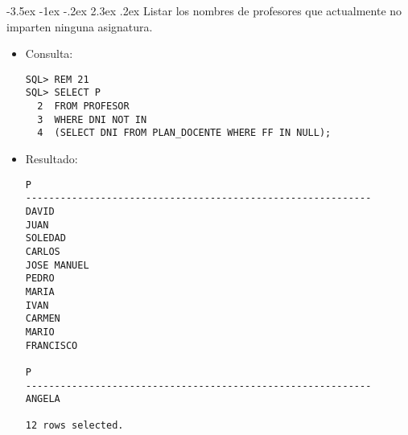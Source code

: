 \documentclass[11pt]{report}
\makeatletter
\renewcommand\chapter{\@startsection{chapter}{0}{\z@}%
    {-3.5ex \@plus -1ex \@minus -.2ex}%
    {2.3ex \@plus.2ex}%
    {\normalfont\Large\bfseries}}
\makeatother
\begin{document}
\chapter{Listar los nombres de profesores que actualmente no imparten ninguna asignatura.}
\begin{itemize}
  \item Consulta:
  \begin{verbatim}
SQL> REM 21
SQL> SELECT P
  2  FROM PROFESOR
  3  WHERE DNI NOT IN
  4  (SELECT DNI FROM PLAN_DOCENTE WHERE FF IN NULL);
  \end{verbatim}
  \item{Resultado:}
  \begin{verbatim}
P                                                                               
------------------------------------------------------------                    
DAVID                                                                           
JUAN                                                                            
SOLEDAD                                                                         
CARLOS                                                                          
JOSE MANUEL                                                                     
PEDRO                                                                           
MARIA                                                                           
IVAN                                                                            
CARMEN                                                                          
MARIO                                                                           
FRANCISCO                                                                       

P                                                                               
------------------------------------------------------------                    
ANGELA                                                                          

12 rows selected.
  \end{verbatim}
\end{itemize}
\end{document}
